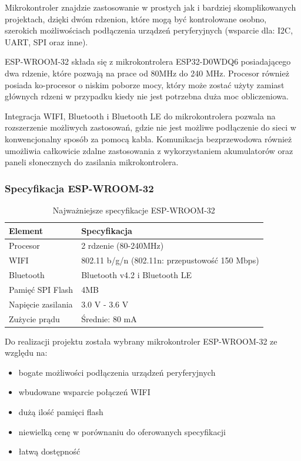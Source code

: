 \documentclass[12pt,a4paper]{article}
\begin{document}
Mikrokontroler znajdzie zastosowanie w prostych jak i bardziej skomplikowanych projektach, dzięki dwóm rdzenion, które mogą być kontrolowane osobno,
szerokich możliwościach podłączenia urządzeń peryferyjnych (wsparcie dla: I2C, UART, SPI oraz inne).

ESP-WROOM-32 składa się z mikrokontrolera ESP32-D0WDQ6 posiadającego dwa rdzenie, które pozwają na prace od 80MHz do 240 MHz. Procesor również
posiada ko-procesor o niskim poborze mocy, który może zostać użyty zamiast głównych rdzeni w przypadku kiedy nie jest potrzebna duża moc obliczeniowa.

Integracja WIFI, Bluetooth i Bluetooth LE do mikrokontrolera pozwala na rozszerzenie możliwych zastosowań, gdzie nie jest możliwe podłączenie do sieci
w konwencjonalny sposób za pomocą kabla. Komunikacja bezprzewodowa również umożliwia całkowicie zdalne zastosowania z wykorzystaniem akumulatorów
oraz paneli słonecznych do zasilania mikrokontrolera.

\subsubsection{Specyfikacja ESP-WROOM-32}

\begin{table}[H]
    \centering
    \begin{tabular}{|l|l|}
        \hline
        Element & Specyfikacja \\
        \hline
        Procesor & 2 rdzenie (80-240MHz) \\
        \hline
        WIFI & 802.11 b/g/n (802.11n: przepustowość 150 Mbps) \\
        \hline
        Bluetooth & Bluetooth v4.2 i Bluetooth LE \\
        \hline
        Pamięć SPI Flash & 4MB \\
        \hline
        Napięcie zasilania & 3.0 V - 3.6 V \\
        \hline
        Zużycie prądu & Średnie: 80 mA \\
        \hline
    \end{tabular}
    \caption{Najważniejsze specyfikacje ESP-WROOM-32}
    \label{esp32-spec}
\end{table}

Do realizacji projektu została wybrany mikrokontroler ESP-WROOM-32 ze względu na:
\begin{itemize}
    \item bogate możliwości podłączenia urządzeń peryferyjnych
    \item wbudowane wsparcie połączeń WIFI
    \item dużą ilość pamięci flash
    \item niewielką cenę w porównaniu do oferowanych specyfikacji
    \item łatwą dostępność
\end{itemize}
\end{document}
